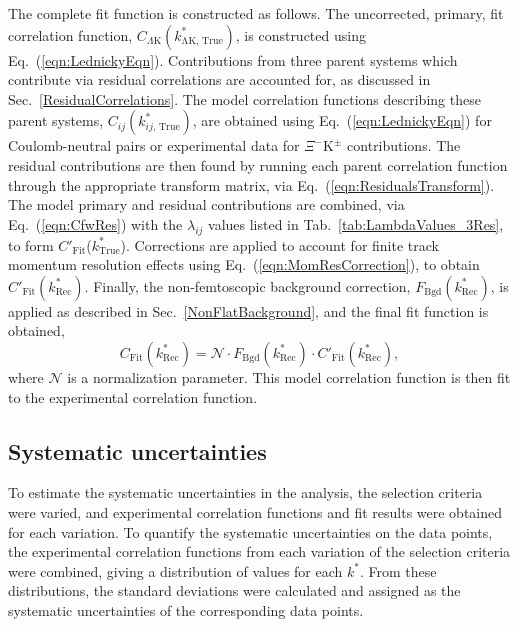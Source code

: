 \documentclass[ALICE,manyauthors]{cernphprep}
\newcommand{\kstar}{$k^{*}$\xspace}
\newcommand{\ktrue}{$k^{*}_{\mathrm{True}}$\xspace}
\newcommand{\XiKpm}{$\Xi^{-}\mathrm{K^{\pm}}$\xspace}
\begin{document}
The complete fit function is constructed as follows.
The uncorrected, primary, fit correlation function, $C_{\Lambda\mathrm{K}}(k^{*}_{\mathrm{\Lambda K,\,True}})$, is constructed using Eq.~(\ref{eqn:LednickyEqn}).
Contributions from three parent systems which contribute via residual correlations are accounted for, as discussed in Sec.~\ref{ResidualCorrelations}.
The model correlation functions describing these parent systems, $C_{ij}(k^{*}_{ij,\,\mathrm{True}})$, are obtained using Eq.~(\ref{eqn:LednickyEqn}) for Coulomb-neutral pairs or experimental data for \XiKpm contributions.
The residual contributions are then found by running each parent correlation function through the appropriate transform matrix, via Eq.~(\ref{eqn:ResidualsTransform}).
The model primary and residual contributions are combined, via Eq.~(\ref{eqn:CfwRes}) with the $\lambda_{ij}$ values listed in Tab.~\ref{tab:LambdaValues_3Res}, to form $C'_{\mathrm{Fit}}$(\ktrue).
Corrections are applied to account for finite track momentum resolution effects using Eq.~(\ref{eqn:MomResCorrection}), to obtain $C'_{\mathrm{Fit}}(k^{*}_{\mathrm{Rec}})$.
Finally, the non-femtoscopic background correction, $F_{\mathrm{Bgd}}(k^{*}_{\mathrm{Rec}})$, is applied as described in Sec.~\ref{NonFlatBackground}, and the final fit function is obtained,
\begin{equation}
C_{\mathrm{Fit}}(k^{*}_{\mathrm{Rec}}) = \mathcal{N}\cdot F_{\mathrm{Bgd}}(k^{*}_{\mathrm{Rec}})\cdot C'_{\mathrm{Fit}}(k^{*}_{\mathrm{Rec}}),
\end{equation}
where $\mathcal{N}$ is a normalization parameter.
This model correlation function is then fit to the experimental correlation function.

\subsection{Systematic uncertainties}
\label{SysErrs}

To estimate the systematic uncertainties in the analysis, the selection criteria were varied, and experimental correlation functions and fit results were obtained for each variation.
To quantify the systematic uncertainties on the data points, the experimental correlation functions from each variation of the selection criteria were combined, giving a distribution of values for each \kstar.
From these distributions, the standard deviations were calculated and assigned as the systematic uncertainties of the corresponding data points.
\end{document}
